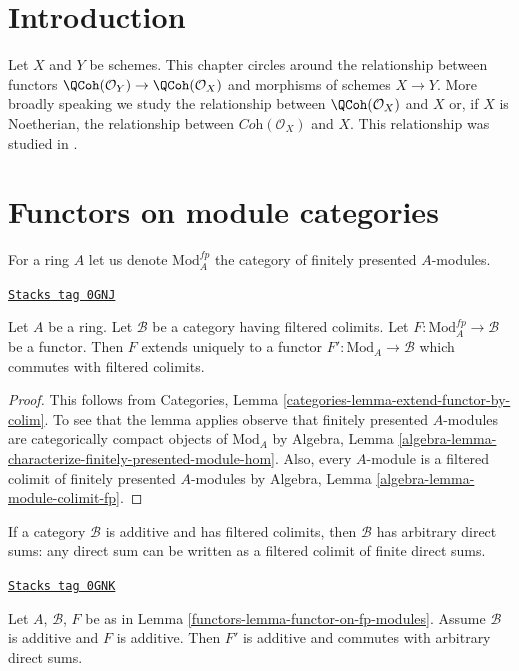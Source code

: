\section{Introduction}
\label{functors-section-introduction}
Let $X$ and $Y$ be schemes. This chapter circles around the relationship
between functors $\QCoh(\mathcal{O}_Y) \to \QCoh(\mathcal{O}_X)$ and
morphisms of schemes $X \to Y$. More broadly speaking we study the
relationship between $\QCoh(\mathcal{O}_X)$ and $X$ or, if $X$ is Noetherian,
the relationship between $\textit{Coh}(\mathcal{O}_X)$ and $X$.
This relationship was studied in \cite{Gabriel}.

\section{Functors on module categories}
\label{functors-section-preliminary}
For a ring $A$ let us denote $\text{Mod}^{fp}_A$ the category of
finitely presented $A$-modules.

\begin{lemma}
\label{functors-lemma-functor-on-fp-modules}
\href{https://stacks.math.columbia.edu/tag/0GNJ}{\texttt{Stacks tag 0GNJ}}

Let $A$ be a ring. Let $\mathcal{B}$ be a category having filtered
colimits. Let $F : \text{Mod}^{fp}_A \to \mathcal{B}$ be a functor. Then $F$
extends uniquely to a functor $F' : \text{Mod}_A \to \mathcal{B}$
which commutes with filtered colimits.
\end{lemma}

\begin{proof}
This follows from
Categories, Lemma \ref{categories-lemma-extend-functor-by-colim}.
To see that the lemma applies observe that
finitely presented $A$-modules are
categorically compact objects of $\text{Mod}_A$ by
Algebra, Lemma \ref{algebra-lemma-characterize-finitely-presented-module-hom}.
Also, every $A$-module is a filtered colimit
of finitely presented $A$-modules by
Algebra, Lemma \ref{algebra-lemma-module-colimit-fp}.
\end{proof}

If a category $\mathcal{B}$ is additive and has filtered colimits,
then $\mathcal{B}$ has arbitrary direct sums: any direct sum can be written
as a filtered colimit of finite direct sums.

\begin{lemma}
\label{functors-lemma-functor-on-fp-modules-additive}
\href{https://stacks.math.columbia.edu/tag/0GNK}{\texttt{Stacks tag 0GNK}}

Let $A$, $\mathcal{B}$, $F$ be as in Lemma \ref{functors-lemma-functor-on-fp-modules}.
Assume $\mathcal{B}$ is additive and $F$ is additive. Then
$F'$ is additive and commutes with arbitrary direct sums.
\end{lemma}

